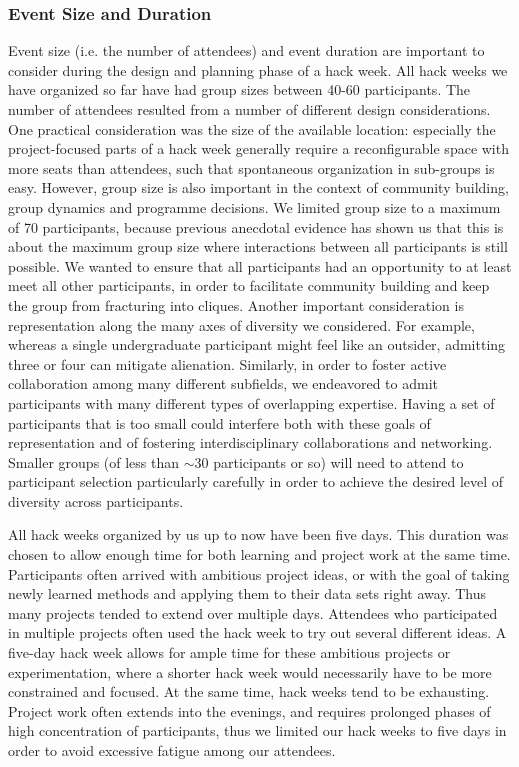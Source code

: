 \documentclass{aastex62}
\begin{document}
\subsubsection{Event Size and Duration}

Event size (i.e. the number of attendees) and event duration are important to consider during the design and planning phase of a hack week. All hack weeks we have organized so far have had group sizes between 40-60 participants. The number of attendees resulted from a number of different design considerations. One practical consideration was the size of the available location: especially the project-focused parts of a hack week generally require a reconfigurable space with more seats than attendees, such that spontaneous organization in sub-groups is easy. However, group size is also important in the context of community building, group dynamics and programme decisions. We limited group size to a maximum of 70 participants, because previous anecdotal evidence has shown us that this is about the maximum group size where interactions between all participants is still possible. We wanted to ensure that all participants had an opportunity to at least meet all other participants, in order to facilitate community building and keep the group from fracturing into cliques. Another important consideration is representation along the many axes of diversity we considered. For example, whereas a single undergraduate participant might feel like an outsider, admitting three or four can mitigate alienation. Similarly, in order to foster active collaboration among many different subfields, we endeavored to admit participants with many different types of overlapping expertise. Having a set of participants that is too small could interfere both with these goals of representation and of fostering interdisciplinary collaborations and networking. Smaller groups (of less than $\sim$30 participants or so) will need to attend to participant selection particularly carefully in order to achieve the desired level of diversity across participants. 

All hack weeks organized by us up to now have been five days. This duration was chosen to allow enough time for both learning and project work at the same time. Participants often arrived with ambitious project ideas, or with the goal of taking newly learned methods and applying them to their data sets right away. Thus many projects tended to extend over multiple days. Attendees who participated in multiple projects often used the hack week to try out several different ideas. A five-day hack week allows for ample time for these ambitious projects or experimentation, where a shorter hack week would necessarily have to be more constrained and focused. At the same time, hack weeks tend to be exhausting. Project work often extends into the evenings, and requires prolonged phases of high concentration of participants, thus we limited our hack weeks to five days in order to avoid excessive fatigue among our attendees.
\end{document}

